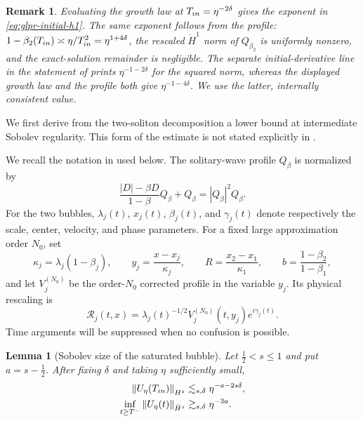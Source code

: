 \documentclass[10pt,a4paper]{amsart}
\numberwithin{equation}{section}
\newtheorem{lemma}[theorem]{Lemma}
\newtheorem{remark}[theorem]{Remark}
\newcommand{\half}{\frac12}
\newcommand{\norm}[1]{\left\lVert #1\right\rVert}
\begin{document}
\begin{remark}\label{rem:glpr-normalization}
Evaluating the growth law \cite[(1.10)]{GLPR} at
$T_{\rm in}=\eta^{-2\delta}$ gives the exponent in
\eqref{eq:glpr-initial-h1}.  The same exponent follows from the profile:
$1-\beta_2(T_{\rm in})\asymp\eta/T_{\rm in}^2
=\eta^{1+4\delta}$, the rescaled $\dot H^1$ norm of $Q_{\beta_2}$ is
uniformly nonzero, and the exact-solution remainder is negligible.  The
separate initial-derivative line in the statement of \cite[Theorem~1.2]{GLPR}
prints $\eta^{-1-2\delta}$ for the squared norm, whereas the displayed growth
law and the profile both give $\eta^{-1-4\delta}$.  We use the latter,
internally consistent value.
\end{remark}

We first derive from the two-soliton decomposition a lower bound at
intermediate Sobolev regularity.  This form of the estimate is not stated
explicitly in \cite{GLPR}.

We recall the notation in \cite{GLPR} used below.  The solitary-wave profile $Q_\beta$
is normalized by
\[
 \frac{|D|-\beta D}{1-\beta}Q_\beta+Q_\beta=|Q_\beta|^2Q_\beta.
\]
For the two bubbles, $\lambda_j(t)$, $x_j(t)$, $\beta_j(t)$, and
$\gamma_j(t)$ denote respectively the scale, center, velocity, and phase
parameters.  For a fixed large approximation order $N_0$, set
\[
 \kappa_j=\lambda_j(1-\beta_j),\qquad
 y_j=\frac{x-x_j}{\kappa_j},\qquad
 R=\frac{x_2-x_1}{\kappa_1},\qquad
 b=\frac{1-\beta_2}{1-\beta_1},
\]
and let $V_j^{(N_0)}$ be the order-$N_0$ corrected profile in the variable
$y_j$.  Its physical rescaling is
\[
 \mathcal R_j(t,x)=\lambda_j(t)^{-1/2}
 V_j^{(N_0)}(t,y_j)e^{i\gamma_j(t)}.
\]
Time arguments will be suppressed when no confusion is possible.

\begin{lemma}[Sobolev size of the saturated bubble]\label{lem:glpr-hs}
Let $\half<s\leq1$ and put $a=s-\half$.  After fixing $\delta$ and taking
$\eta$ sufficiently small,
\begin{align}
 \norm{U_\eta(T_{\rm in})}_{H^s}
 &\lesssim_{s,\delta}
 \eta^{-a-2s\delta},\label{eq:initial-hs}\\
 \inf_{t\geq T^-}\norm{U_\eta(t)}_{\dot H^s}
 &\gtrsim_{s,\delta}\eta^{-3a}.
 \label{eq:saturated-hs}
\end{align}
\end{lemma}
\end{document}
